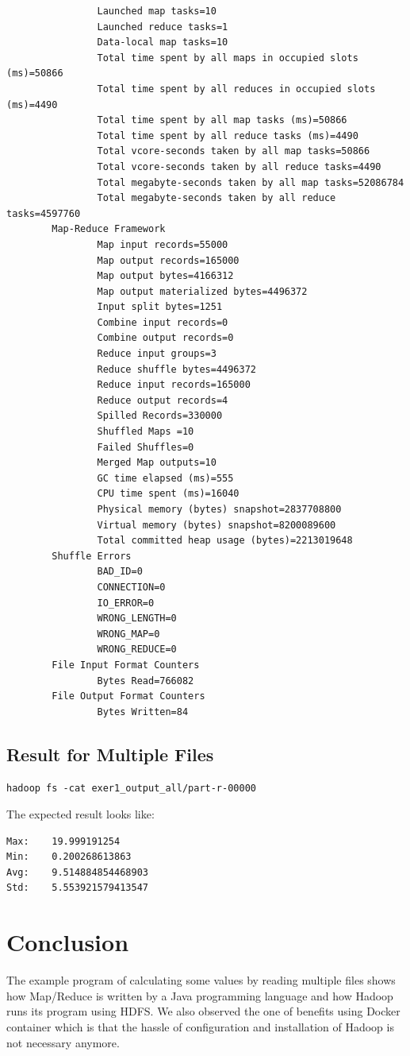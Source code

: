 \begin{lstlisting}
                Launched map tasks=10
                Launched reduce tasks=1
                Data-local map tasks=10
                Total time spent by all maps in occupied slots (ms)=50866
                Total time spent by all reduces in occupied slots (ms)=4490
                Total time spent by all map tasks (ms)=50866
                Total time spent by all reduce tasks (ms)=4490
                Total vcore-seconds taken by all map tasks=50866
                Total vcore-seconds taken by all reduce tasks=4490
                Total megabyte-seconds taken by all map tasks=52086784
                Total megabyte-seconds taken by all reduce tasks=4597760
        Map-Reduce Framework
                Map input records=55000
                Map output records=165000
                Map output bytes=4166312
                Map output materialized bytes=4496372
                Input split bytes=1251
                Combine input records=0
                Combine output records=0
                Reduce input groups=3
                Reduce shuffle bytes=4496372
                Reduce input records=165000
                Reduce output records=4
                Spilled Records=330000
                Shuffled Maps =10
                Failed Shuffles=0
                Merged Map outputs=10
                GC time elapsed (ms)=555
                CPU time spent (ms)=16040
                Physical memory (bytes) snapshot=2837708800
                Virtual memory (bytes) snapshot=8200089600
                Total committed heap usage (bytes)=2213019648
        Shuffle Errors
                BAD_ID=0
                CONNECTION=0
                IO_ERROR=0
                WRONG_LENGTH=0
                WRONG_MAP=0
                WRONG_REDUCE=0
        File Input Format Counters
                Bytes Read=766082
        File Output Format Counters
                Bytes Written=84
\end{lstlisting}


\subsection{Result for Multiple Files}

\begin{lstlisting}
hadoop fs -cat exer1_output_all/part-r-00000
\end{lstlisting}

The expected result looks like:

\begin{lstlisting}
Max:    19.999191254
Min:    0.200268613863
Avg:    9.514884854468903
Std:    5.553921579413547
\end{lstlisting}

\section{Conclusion}

The example program of calculating some values by reading multiple
files shows how Map/Reduce is written by a Java programming language
and how Hadoop runs its program using HDFS. We also observed the one
of benefits using Docker container which is that the hassle of
configuration and installation of Hadoop is not necessary anymore.


